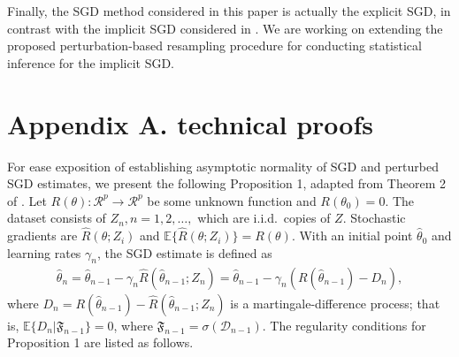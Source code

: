 \documentclass[twoside,11pt]{article}
\def\wh{\widehat}
\begin{document}
Finally, the SGD method considered in this paper is actually the explicit SGD, in contrast with the implicit SGD considered in \citet{Toulis17}. We are working on extending the proposed perturbation-based resampling procedure for conducting statistical inference for the implicit SGD.


\appendix
\section*{Appendix A. technical proofs}


For ease exposition of establishing
asymptotic normality of SGD and perturbed SGD estimates, we present the following Proposition 1, adapted from Theorem 2 of \citet[pp.841]{Polyak92}.
Let $R(\theta): \mathcal{R}^p \rightarrow \mathcal{R}^p$ be some unknown function and $R(\theta_0)=0$.
The dataset consists of $Z_n, n=1,2,\dots,$ which are i.i.d.~copies of $Z$. Stochastic
gradients are  $\wh{R}(\theta; Z_i)$ and $\mathbb{E}\{\wh{R}(\theta; Z_i)\}=R(\theta)$. With an initial point $\wh{\theta}_0$ and learning rates  $\gamma_n$, the SGD estimate is defined as
\begin{eqnarray}
\wh{\theta}_n=\wh{\theta}_{n-1} - \gamma_n \wh{R}(\wh{\theta}_{n-1}; Z_n)=\wh{\theta}_{n-1}-\gamma_n\left(R(\wh{\theta}_{n-1})-D_n\right),
\end{eqnarray}
where $D_n=R(\wh{\theta}_{n-1})-\wh{R}(\wh{\theta}_{n-1}; Z_n)$ is a martingale-difference process; that is, $\mathbb{E}\{D_n|\mathfrak{F}_{n-1}\}=0$, where $\mathfrak{F}_{n-1}=\sigma(\mathcal{D}_{n-1})$. The regularity conditions for Proposition 1 are
listed as follows.
\end{document}
